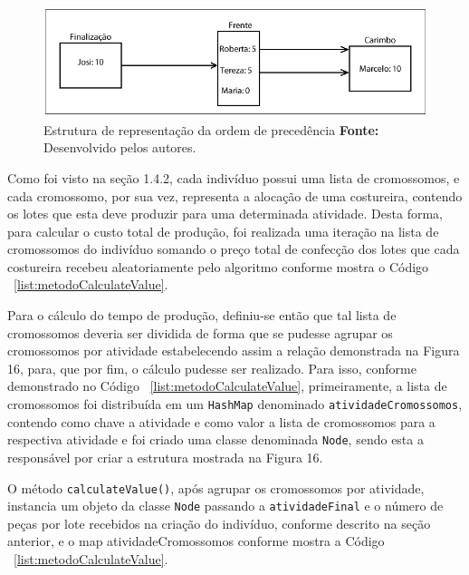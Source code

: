 
\begin{figure}[h!]
	\centerline{\includegraphics[scale=1.0]{./imagens/montagem_node.png}}
	\caption[Estrutura de representação da ordem de precedência]
	{Estrutura de representação da ordem de precedência \textbf{Fonte:}
	Desenvolvido pelos autores.}
	\label{fig:montagem_node}
\end{figure}


\par Como foi visto na seção 1.4.2, cada indivíduo possui uma lista de
cromossomos, e cada cromossomo, por sua vez, representa a alocação de uma
costureira, contendo os lotes que esta deve produzir para uma determinada atividade.
Desta forma, para calcular o custo total de produção, foi realizada uma iteração 
na lista de cromossomos do indivíduo somando o preço total de confecção dos lotes
que cada costureira recebeu aleatoriamente pelo algoritmo conforme mostra o Código
~\ref{list:metodoCalculateValue}.

\par Para o cálculo do tempo de produção, definiu-se então que tal lista de cromossomos deveria ser
dividida de forma que se pudesse agrupar os cromossomos por atividade estabelecendo assim a relação 
demonstrada na Figura 16, para, que por fim, o cálculo pudesse ser realizado.
Para isso, conforme demonstrado no Código ~\ref{list:metodoCalculateValue}, primeiramente, a lista de 
cromossomos foi distribuída em um \texttt{HashMap} denominado \texttt{atividadeCromossomos}, contendo 
como chave a atividade e como valor a lista de cromossomos para a respectiva atividade e foi criado uma 
classe denominada \texttt{Node}, sendo esta a responsável por criar a estrutura mostrada na Figura 16.

\par O método \texttt{calculateValue()}, após agrupar os cromossomos por atividade, 
 instancia um objeto da classe \texttt{Node} passando a \texttt{atividadeFinal} e o número de 
 peças por lote recebidos na criação do indivíduo, conforme descrito na seção anterior, e o map 
 atividadeCromossomos conforme mostra a Código ~\ref{list:metodoCalculateValue}.


